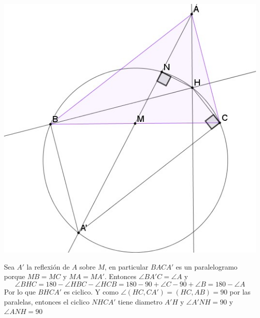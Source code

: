 \documentclass[11pt]{scrartcl}
\begin{document}
    \begin{soln}
    \begin{center}
        \includegraphics[scale=0.5]{AC5.jpg}
    \end{center}
        Sea $A'$ la reflexi\'on de $A$ sobre $M$, en particular $BACA'$ es un paralelogramo porque $MB=MC$ y $MA=MA'$. Entonces $\angle BA'C=\angle A$ y 
        $$\angle BHC =180-\angle HBC-\angle HCB=180-90+\angle C-90+\angle B=180-\angle A$$
        Por lo que $BHCA'$ es ciclico. Y como $\angle (HC, CA')=(HC,AB)=90$ por las paralelas, entonces el ciclico $NHCA'$ tiene diametro $A'H$ y $\angle A'NH=90$ y $\angle ANH=90$
    \end{soln}
\end{document}
